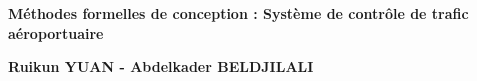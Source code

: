 
\begin{titlepage}
	\parindent=0pt
 
\addtolength{\wpXoffset}{-4.5cm}

	
	\hrulefill
	\begin{center}\bfseries\Huge
		\color{white}
		{Méthodes formelles de conception : Système de contrôle de trafic aéroportuaire} 
	\end{center}
	\hrulefill
	
	\vspace*{1cm}
	\begin{center}\bfseries\Large
			\color{white}
		{Ruikun YUAN - Abdelkader BELDJILALI}
		
	\end{center}
	


\end{titlepage}